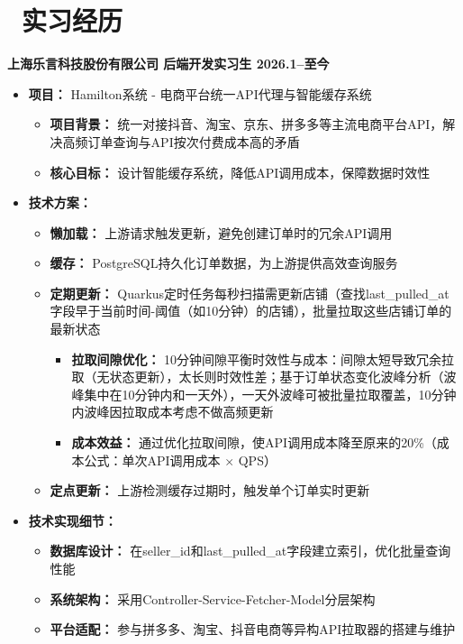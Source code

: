 \documentclass[11pt]{article}
\begin{document}
\section{\makebox[\widthof{\faGraduationCap}][c]{\color{CVBlue}\faUsers}\ 实习经历}
\textbf{上海乐言科技股份有限公司 \hfill 后端开发实习生 \hfill 2026.1--至今}
\begin{itemize}
    \item \textbf{项目：} Hamilton系统 - 电商平台统一API代理与智能缓存系统
    \begin{itemize}
        \item \textbf{项目背景：} 统一对接抖音、淘宝、京东、拼多多等主流电商平台API，解决高频订单查询与API按次付费成本高的矛盾
        \item \textbf{核心目标：} 设计智能缓存系统，降低API调用成本，保障数据时效性
    \end{itemize}

    \item \textbf{技术方案：}
    \begin{itemize}
        \item \textbf{懒加载：} 上游请求触发更新，避免创建订单时的冗余API调用
        \item \textbf{缓存：} PostgreSQL持久化订单数据，为上游提供高效查询服务
        \item \textbf{定期更新：} Quarkus定时任务每秒扫描需更新店铺（查找last\_pulled\_at字段早于当前时间-阈值（如10分钟）的店铺），批量拉取这些店铺订单的最新状态
            \begin{itemize}
                \item \textbf{拉取间隙优化：} 10分钟间隙平衡时效性与成本：间隙太短导致冗余拉取（无状态更新），太长则时效性差；基于订单状态变化波峰分析（波峰集中在10分钟内和一天外），一天外波峰可被批量拉取覆盖，10分钟内波峰因拉取成本考虑不做高频更新
                \item \textbf{成本效益：} 通过优化拉取间隙，使API调用成本降至原来的20\%（成本公式：单次API调用成本 $\times$ QPS）
            \end{itemize}
        \item \textbf{定点更新：} 上游检测缓存过期时，触发单个订单实时更新%
    \end{itemize}

    \item \textbf{技术实现细节：}
    \begin{itemize}
        \item \textbf{数据库设计：} 在seller\_id和last\_pulled\_at字段建立索引，优化批量查询性能
        \item \textbf{系统架构：} 采用Controller-Service-Fetcher-Model分层架构
        \item \textbf{平台适配：} 参与拼多多、淘宝、抖音电商等异构API拉取器的搭建与维护
    \end{itemize}


\end{itemize}
\end{document}
